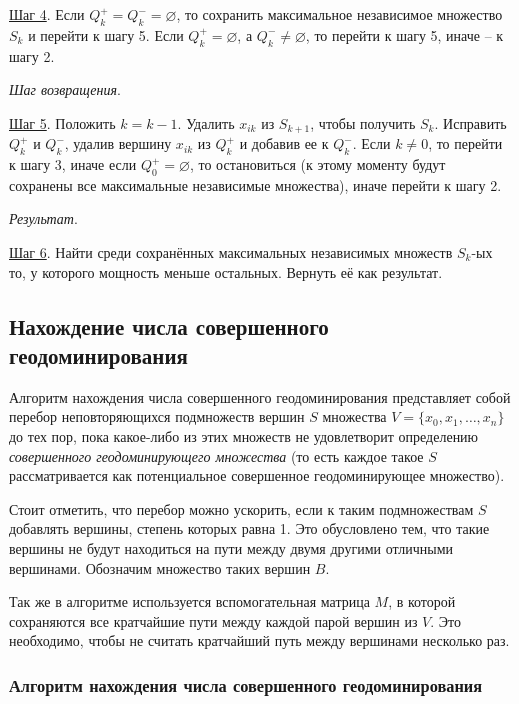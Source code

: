 \documentclass[bachelor, och, nir]{SCWorks}
\begin{document}
\underline{Шаг 4}. Если $Q_k^+ = Q_k^- = \varnothing$, то сохранить максимальное независимое множество $S_k$ и перейти к шагу 5. Если $Q_k^+ = \varnothing$, а $Q_k^- \neq \varnothing $, то перейти к шагу 5, иначе -- к шагу 2.

\textit{Шаг возвращения}.

\underline{Шаг 5}. Положить $k = k - 1$. Удалить $x_{ik}$ из $S_{k+1}$, чтобы получить $S_k$. Исправить $Q_k^+$ и $Q_k^-$, удалив вершину $x_{ik}$ из $Q_k^+$  и добавив ее к $Q_k^-$. Если $k \neq 0$, то перейти к шагу 3, иначе если $Q_0^+ = \varnothing$, то остановиться (к этому моменту будут сохранены все максимальные независимые множества), иначе перейти к шагу 2.

\textit{Результат}.

\underline{Шаг 6}. Найти среди сохранённых максимальных независимых множеств $S_k$-ых то, у которого
мощность меньше остальных. Вернуть её как результат.

\subsection{Нахождение числа совершенного геодоминирования}
Алгоритм нахождения числа совершенного геодоминирования представляет собой 
перебор неповторяющихся подмножеств вершин $S$ множества $V = \{x_0, x_1, \dots, x_n\}$ до тех пор, пока
какое-либо из этих множеств не удовлетворит определению \textit{совершенного 
геодоминирующего множества} (то есть каждое такое $S$ рассматривается как 
потенциальное совершенное геодоминирующее множество). 

Стоит отметить, что перебор можно ускорить, если к таким подмножествам $S$ 
добавлять вершины, степень которых равна 1. Это обусловлено тем, что такие вершины не будут
находиться на пути между двумя другими отличными вершинами. Обозначим множество
таких вершин $B$.

Так же в алгоритме используется вспомогательная матрица $M$, в которой сохраняются
все кратчайшие пути между каждой парой вершин из $V$. Это необходимо, чтобы не считать
кратчайший путь между вершинами несколько раз.


\subsubsection{Алгоритм нахождения числа совершенного геодоминирования}
\end{document}
